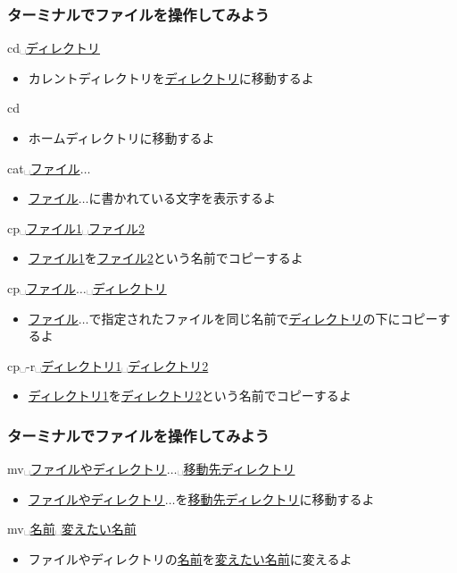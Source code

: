 \begin{frame}
    \frametitle{ターミナルでファイルを操作してみよう}
    cd␣\underline{ディレクトリ}
    \begin{itemize}
        \small
        \item カレントディレクトリを\underline{ディレクトリ}に移動するよ
    \end{itemize}
    cd
    \begin{itemize}
        \small
        \item ホームディレクトリに移動するよ
    \end{itemize}
    cat␣\underline{ファイル}$\ldots$
    \begin{itemize}
        \small
        \item \underline{ファイル}$\ldots$に書かれている文字を表示するよ
    \end{itemize}
    cp␣\underline{ファイル1}␣\underline{ファイル2}
    \begin{itemize}
        \small
        \item \underline{ファイル1}を\underline{ファイル2}という名前でコピーするよ
    \end{itemize}
    cp␣\underline{ファイル}$\ldots$␣\underline{ディレクトリ}
    \begin{itemize}
        \small
        \item \underline{ファイル}$\ldots$で指定されたファイルを同じ名前で\underline{ディレクトリ}の下にコピーするよ
    \end{itemize}
    cp␣-r␣\underline{ディレクトリ1}␣\underline{ディレクトリ2}
    \begin{itemize}
        \small
        \item \underline{ディレクトリ1}を\underline{ディレクトリ2}という名前でコピーするよ
    \end{itemize}
\end{frame}

\begin{frame}
    \frametitle{ターミナルでファイルを操作してみよう}
    mv␣\underline{ファイルやディレクトリ}$\ldots$␣\underline{移動先ディレクトリ}
    \begin{itemize}
        \item \underline{ファイルやディレクトリ}$\ldots$を\underline{移動先ディレクトリ}に移動するよ
    \end{itemize}
    mv␣\underline{名前}␣\underline{変えたい名前}
    \begin{itemize}
        \item ファイルやディレクトリの\underline{名前}を\underline{変えたい名前}に変えるよ
    \end{itemize}
\end{frame}

